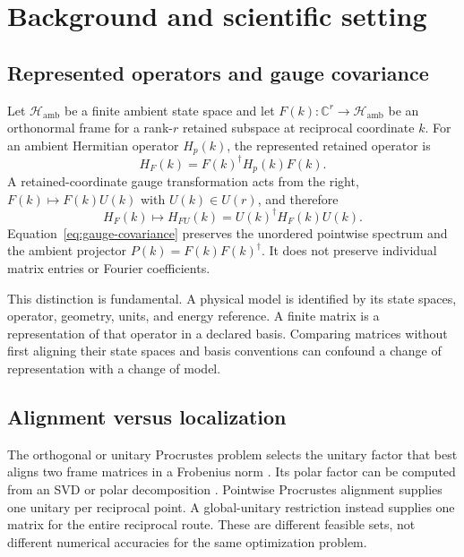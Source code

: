 \documentclass[11pt]{article}
\begin{document}
\section{Background and scientific setting}
\label{sec:background}

\subsection{Represented operators and gauge covariance}

Let $\mathcal H_{\mathrm{amb}}$ be a finite ambient state space and let
$F(k):\mathbb C^r\rightarrow\mathcal H_{\mathrm{amb}}$ be an orthonormal frame for a
rank-$r$ retained subspace at reciprocal coordinate $k$. For an ambient Hermitian
operator $H_p(k)$, the represented retained operator is
\begin{equation}
 H_F(k)=F(k)^\dagger H_p(k)F(k).
 \label{eq:represented-operator}
\end{equation}
A retained-coordinate gauge transformation acts from the right,
$F(k)\mapsto F(k)U(k)$ with $U(k)\in U(r)$, and therefore
\begin{equation}
 H_F(k)\mapsto H_{FU}(k)=U(k)^\dagger H_F(k)U(k).
 \label{eq:gauge-covariance}
\end{equation}
Equation~\eqref{eq:gauge-covariance} preserves the unordered pointwise spectrum and the
ambient projector $P(k)=F(k)F(k)^\dagger$. It does not preserve individual matrix
entries or Fourier coefficients.

This distinction is fundamental. A physical model is identified by its state spaces,
operator, geometry, units, and energy reference. A finite matrix is a representation of
that operator in a declared basis. Comparing matrices without first aligning their state
spaces and basis conventions can confound a change of representation with a change of
model.

\subsection{Alignment versus localization}

The orthogonal or unitary Procrustes problem selects the unitary factor that best aligns
two frame matrices in a Frobenius norm \cite{schoenemann1966}. Its polar factor can be
computed from an SVD or polar decomposition
\cite{higham1986,golubVanLoan2013}. Pointwise Procrustes alignment supplies one unitary
per reciprocal point. A global-unitary restriction instead supplies one matrix for the
entire reciprocal route. These are different feasible sets, not different numerical
accuracies for the same optimization problem.
\end{document}
